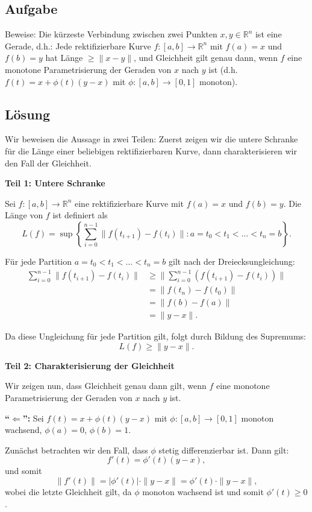 \documentclass{article}
\newcommand{\R}{\mathbb{R}}
\newcommand{\norm}[1]{\|#1\|}
\begin{document}
\subsection*{Aufgabe}
Beweise: Die kürzeste Verbindung zwischen zwei Punkten $x,y\in\R^n$
ist eine Gerade, d.h.: Jede rektifizierbare Kurve $f:[a,b]\to\R^n$ 
mit $f(a)=x$ und $f(b)=y$ hat Länge $\geq\norm{x-y}$, und Gleichheit
gilt genau dann, wenn $f$ eine monotone Parametrisierung der Geraden
von $x$ nach $y$ ist (d.h.~$f(t)=x+\phi(t)(y-x)$ mit
$\phi:[a,b]\to[0,1]$ monoton).

\subsection*{Lösung}

Wir beweisen die Aussage in zwei Teilen: Zuerst zeigen wir die untere Schranke für die Länge einer beliebigen rektifizierbaren Kurve, dann charakterisieren wir den Fall der Gleichheit.

\textbf{Teil 1: Untere Schranke}

Sei $f:[a,b]\to\R^n$ eine rektifizierbare Kurve mit $f(a)=x$ und $f(b)=y$. Die Länge von $f$ ist definiert als
\[
L(f) = \sup\left\{\sum_{i=0}^{n-1} \norm{f(t_{i+1}) - f(t_i)} : a = t_0 < t_1 < \ldots < t_n = b\right\}.
\]

Für jede Partition $a = t_0 < t_1 < \ldots < t_n = b$ gilt nach der Dreiecksungleichung:
\begin{align}
\sum_{i=0}^{n-1} \norm{f(t_{i+1}) - f(t_i)} &\geq \norm{\sum_{i=0}^{n-1} (f(t_{i+1}) - f(t_i))}\\
&= \norm{f(t_n) - f(t_0)}\\
&= \norm{f(b) - f(a)}\\
&= \norm{y - x}.
\end{align}

Da diese Ungleichung für jede Partition gilt, folgt durch Bildung des Supremums:
\[
L(f) \geq \norm{y - x}.
\]

\textbf{Teil 2: Charakterisierung der Gleichheit}

Wir zeigen nun, dass Gleichheit genau dann gilt, wenn $f$ eine monotone Parametrisierung der Geraden von $x$ nach $y$ ist.

\textbf{``$\Leftarrow$'':} Sei $f(t) = x + \phi(t)(y-x)$ mit $\phi:[a,b]\to[0,1]$ monoton wachsend, $\phi(a)=0$, $\phi(b)=1$.

Zunächst betrachten wir den Fall, dass $\phi$ stetig differenzierbar ist. Dann gilt:
\[
f'(t) = \phi'(t)(y-x),
\]
und somit
\[
\norm{f'(t)} = |\phi'(t)| \cdot \norm{y-x} = \phi'(t) \cdot \norm{y-x},
\]
wobei die letzte Gleichheit gilt, da $\phi$ monoton wachsend ist und somit $\phi'(t) \geq 0$.
\end{document}
